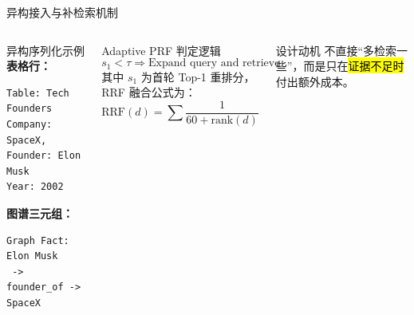 \begin{frame}[fragile]{异构接入与补检索机制}
  \begin{columns}[T,onlytextwidth]
    \begin{block}{异构序列化示例}
      \textbf{表格行：}
      \begin{lstlisting}[style=shellstyle, basicstyle=\ttfamily\tiny]
Table: Tech Founders
Company: SpaceX, Founder: Elon Musk
Year: 2002
      \end{lstlisting}
      \textbf{图谱三元组：}
      \begin{lstlisting}[style=shellstyle, basicstyle=\ttfamily\tiny]
Graph Fact: Elon Musk
 -> founder_of -> SpaceX
      \end{lstlisting}
    \end{block}

    \begin{block}{Adaptive PRF 判定逻辑}
      \[
        s_1 < \tau \Rightarrow \text{Expand query and retrieve again}
      \]
      其中 $s_1$ 为首轮 Top-1 重排分，RRF 融合公式为：
      \[
        \mathrm{RRF}(d)=\sum \frac{1}{60+\mathrm{rank}(d)}
      \]
    \end{block}
    \begin{alertblock}{设计动机}
      不直接“多检索一些”，而是只在\hl{证据不足时}付出额外成本。
    \end{alertblock}
  \end{columns}
\end{frame}
